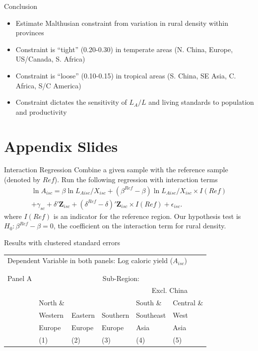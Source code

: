 \documentclass[10pt, xcolor=dvipsnames]{beamer}
\begin{document}
\begin{frame}{Conclusion}
\begin{itemize}
  \item Estimate Malthusian constraint from variation in rural density within provinces
  \item Constraint is ``tight'' (0.20-0.30) in temperate areas (N. China, Europe, US/Canada, S. Africa)
  \item Constraint is ``loose'' (0.10-0.15) in tropical areas (S. China, SE Asia, C. Africa, S/C America)
  \item Constraint dictates the sensitivity of $L_A/L$ and living standards to population and productivity
\end{itemize}
\end{frame}

\section{Appendix Slides}
\appendix

\begin{frame}{Interaction Regression}\label{interaction}
Combine a given sample with the reference sample (denoted by $Ref$). Run the following regression with interaction terms
\begin{eqnarray}
    \ln A_{isc} = \beta \ln L_{Aisc}/X_{isc} + (\beta^{Ref} - \beta) \ln L_{Aisc}/X_{isc} \times I(Ref) \\ \nonumber
    + \gamma_{sc} + \delta' \mathbf{Z}_{isc} + (\delta^{Ref} - \delta)'\mathbf{Z}_{isc} \times I(Ref) + \epsilon_{isc}. \label{EQ_interaction}
\end{eqnarray}
where $I(Ref)$ is an indicator for the reference region. Our hypothesis test is $H_0: \beta^{Ref} - \beta = 0$, the coefficient on the interaction term for rural density. 

\hfill \hyperlink{testing}{}
\end{frame}

\begin{frame}{Results with clustered standard errors}\label{cluster}

{\scriptsize
\begin{tabularx}{\textwidth}{lXXXXX}
\midrule
\multicolumn{6}{l}{Dependent Variable in both panels: Log caloric yield ($A_{isc}$)} \\ \\
\\
Panel A & \multicolumn{5}{c}{Sub-Region:} \\ \cmidrule{2-6}
 &          &         &             &  \multicolumn{2}{c}{Excl. China} \\ \cmidrule(lr){5-6}
 & North \& &         &              & South \&  & Central \&             \\
 & Western  & Eastern & Southern     & Southeast & West        \\
 & Europe   & Europe  & Europe       & Asia      & Asia      \\
 & (1) & (2) & (3) & (4) & (5) \\
\midrule

\midrule
\end{tabularx}
}

\end{frame}
\end{document}
